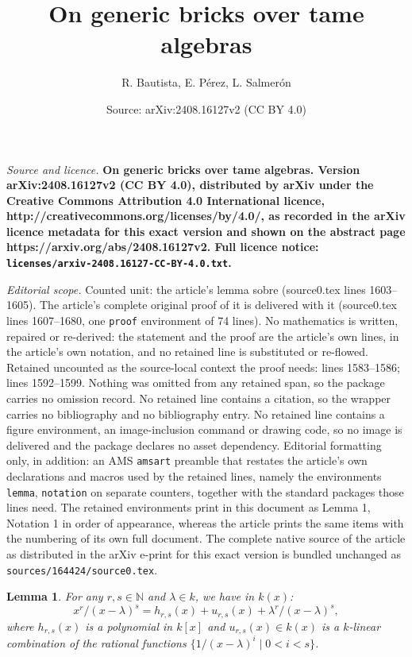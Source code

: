 \documentclass[10pt,a4paper]{amsart}
\title{\bf {\Large On generic bricks over tame algebras}}
\author{R. Bautista, E. P\'erez, L. Salmer\'on}
\date{Source: arXiv:2408.16127v2 (CC BY 4.0)}
\newtheorem{lemma}{Lemma}
\newcommand{\hueca}[1]{\mathbb{#1}}
\begin{document}
\maketitle

\noindent\emph{Source and licence.} \bf {\Large On generic bricks over tame algebras}. Version arXiv:2408.16127v2 (CC BY 4.0), distributed by arXiv under the Creative Commons Attribution 4.0 International licence, http://creativecommons.org/licenses/by/4.0/, as recorded in the arXiv licence metadata for this exact version and shown on the abstract page https://arxiv.org/abs/2408.16127v2. Full licence notice: \texttt{licenses/arxiv-2408.16127-CC-BY-4.0.txt}.\par\smallskip

\noindent\textit{Editorial scope.} Counted unit: the article's lemma sobre (source0.tex lines 1603--1605). The article's complete original proof of it is delivered with it (source0.tex lines 1607--1680, one \texttt{proof} environment of 74 lines). No mathematics is written, repaired or re-derived: the statement and the proof are the article's own lines, in the article's own notation, and no retained line is substituted or re-flowed.  Retained uncounted as the source-local context the proof needs: lines 1583--1586; lines 1592--1599.  Nothing was omitted from any retained span, so the package carries no omission record.  No retained line contains a citation, so the wrapper carries no bibliography and no bibliography entry.  No retained line contains a figure environment, an image-inclusion command or drawing code, so no image is delivered and the package declares no asset dependency.  Editorial formatting only, in addition: an AMS \texttt{amsart} preamble that restates the article's own declarations and macros used by the retained lines, namely the environments \texttt{lemma}, \texttt{notation} on separate counters, together with the standard packages those lines need.  The retained environments print in this document as Lemma 1, Notation 1 in order of appearance, whereas the article prints the same items with the numbering of its own full document.  The complete native source of the article as distributed in the arXiv e-print for this exact version is bundled unchanged as \texttt{sources/164424/source0.tex}.
\begin{lemma}\label{L: cocientes combin lin de basicos en k(x)} For any $r,s\in \hueca{N}$ and $\lambda\in k$, we have in $k(x)$: 
$$x^r/(x-\lambda)^s=h_{r,s}(x)+u_{r,s}(x)+\lambda^r/(x-\lambda)^s,$$
where $h_{r,s}(x)$ is a polynomial in $k[x]$ and $u_{r,s}(x)\in k(x)$ is a $k$-linear combination of the rational functions $\{1/(x-\lambda)^i\mid 0<i<s\}$. 
\end{lemma}
\end{document}
